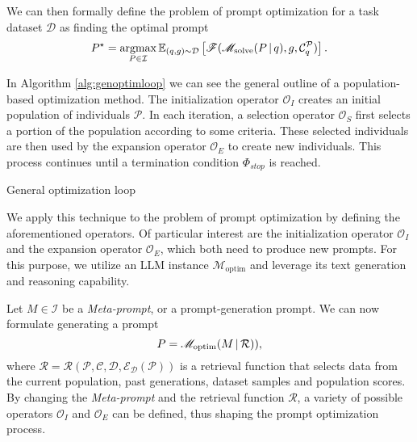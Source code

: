 We can then formally define the problem of prompt optimization for a task dataset $\mathcal{D}$ as finding the optimal prompt 
\begin{equation}
    \label{eq:optimdef}
    P^{\star} = \underset{P\in\mathcal{I}}{\operatorname{argmax}}\,\mathbb{E}_{(q, g) \sim \mathcal{D}}\left[\mathscr{F}(\mathscr{M}_{\text{solve}}(P \, \vert \, q), g, \mathcal{C}_{q}^{\mathcal{P}})\right].
\end{equation}

In Algorithm \ref{alg:genoptimloop} we can see the general outline of a population-based optimization method.
The initialization operator $\mathscr{O}_I$ creates an initial population of individuals $\mathcal{P}$. 
In each iteration, a selection operator $\mathscr{O}_S$ first selects a portion of the population according to some criteria. 
These selected individuals are then used by the expansion operator $\mathscr{O}_E$ to create new individuals.
This process continues until a termination condition $\Phi_{stop}$ is reached.

\begin{algorithm}
    \caption{General optimization loop}
    \label{alg:genoptimloop}
     
         
    \end{algorithm}
    
We apply this technique to the problem of prompt optimization by defining the aforementioned operators.
Of particular interest are the initialization operator $\mathscr{O}_I$ and the expansion operator $\mathscr{O}_E$, which
both need to produce new prompts. For this purpose, we utilize an LLM instance $\mathscr{M}_{\text{optim}}$ and leverage its 
text generation and reasoning capability.

Let $M\in\mathcal{I}$ be a \textit{Meta-prompt}, or a prompt-generation prompt. We can now formulate generating a prompt 
\begin{equation}
    \label{eq:metaprompting}
    P = \mathscr{M}_{\text{optim}}(M\, \vert \, \mathcal{R})),
\end{equation}
where $\mathcal{R} = \mathcal{R}(\mathcal{P}, \mathcal{C}, \mathcal{D}, \mathcal{E}_{\mathcal{D}}(\mathcal{P}))$ is a retrieval function that selects data
from the current population, past generations, dataset samples and population scores. 
By changing the \textit{Meta-prompt} and the retrieval function $\mathcal{R}$, a variety of possible operators $\mathscr{O}_I$ and $\mathscr{O}_E$
can be defined, thus shaping the prompt optimization process.  

